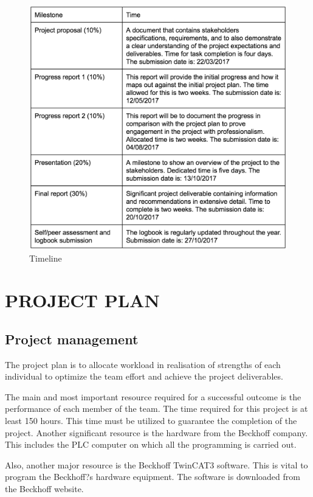 \documentclass[a4paper, 10pt, conference]{IEEEconf}
\begin{document}
\begin{figure}[h!]
  \includegraphics[width=\linewidth]{images/Timeline}
  \caption{Timeline}
  \label{fig:Timeline}
\end{figure}


\section{PROJECT PLAN}

\subsection{Project management}

The project plan is to allocate workload in realisation of strengths of each individual to optimize the team effort and achieve the project deliverables. 

The main and most important resource required for a successful outcome is the performance of each member of the team. The time required for this project is at least 150 hours. This time must be utilized to guarantee the completion of the project.
Another significant resource is the hardware from the Beckhoff company. This includes the PLC computer on which all the programming is carried out.

Also, another major resource is the Beckhoff TwinCAT3 software. This is vital to program the Beckhoff?s hardware equipment. The software is downloaded from the Beckhoff website.
\end{document}
